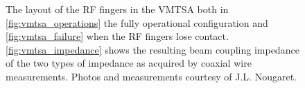 \begin{figure}
\caption{The layout of the RF fingers in the VMTSA both in \ref{fig:vmtsa_operations} the fully operational configuration and \ref{fig:vmtsa_failure} when the RF fingers lose contact. \ref{fig:vmtsa_impedance} shows the resulting beam coupling impedance of the two types of impedance as acquired by coaxial wire measurements. Photos and measurements courtesy of J.L. Nougaret.}
\label{fig:rf_finger_imp}
\end{figure}